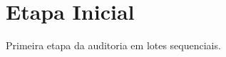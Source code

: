 \documentclass{article}
\begin{document}
\section{Etapa Inicial}
Primeira etapa da auditoria em lotes sequenciais.


\end{document}
